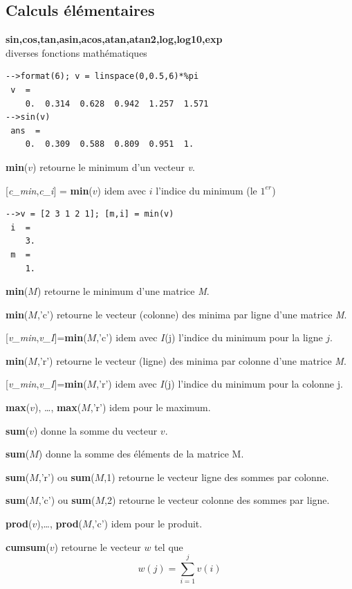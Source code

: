 \documentclass{article}
\begin{document}
\begin{multicols}{3}
\subsection*{Calculs élémentaires}
\begin{description}
\item{\textbf{sin,cos,tan,asin,acos,atan,atan2,log,log10,exp}}\\
diverses fonctions mathématiques
\begin{verbatim}
-->format(6); v = linspace(0,0.5,6)*%pi
 v  =
    0.  0.314  0.628  0.942  1.257  1.571  
-->sin(v)
 ans  =
    0.  0.309  0.588  0.809  0.951  1.
\end{verbatim}
\item{\textbf{min}($v$)} retourne le minimum d'un vecteur \textit{v}.
\item{[\textit{c\_min},\textit{c\_i}] = \textbf{min}($v$)} idem avec $i$ l'indice du minimum (le $1^{er}$)
\begin{verbatim}
-->v = [2 3 1 2 1]; [m,i] = min(v)
 i  =
    3.  
 m  =
    1. 
\end{verbatim}
\item{\textbf{min}($M$)} retourne le minimum d'une matrice \textit{M}.
\item{\textbf{min}($M$,'c')} retourne le vecteur (colonne) des minima par ligne d'une matrice \textit{M}.
\item{[\textit{v\_min},\textit{v\_I}]=\textbf{min}($M$,'c')} idem avec $I$(j) l'indice du minimum pour la ligne $j$.
\item{\textbf{min}($M$,'r')} retourne le vecteur (ligne) des minima par colonne d'une matrice \textit{M}.
\item{[\textit{v\_min},\textit{v\_I}]=\textbf{min}($M$,'r')} idem avec $I$(j) l'indice du minimum pour la colonne j.
\item{\textbf{max}($v$), \ldots, \textbf{max}($M$,'r')} idem pour le maximum.
\item{\textbf{sum}($v$)} donne la somme du vecteur $v$.
\item{\textbf{sum}($M$)} donne la somme des éléments de la matrice M.
\item{\textbf{sum}($M$,'r') ou \textbf{sum}($M$,1)} retourne le vecteur ligne des sommes par colonne.
\item{\textbf{sum}($M$,'c') ou \textbf{sum}($M$,2)} retourne le vecteur colonne des sommes par ligne.
\item{\textbf{prod}($v$),\ldots, \textbf{prod}($M$,'c')} idem pour le produit.
\item{\textbf{cumsum}($v$)} retourne le vecteur $w$ tel que $$w(j) = \sum_{i=1}^{j} v(i)$$ 

\end{description}
\end{multicols}
\end{document}
